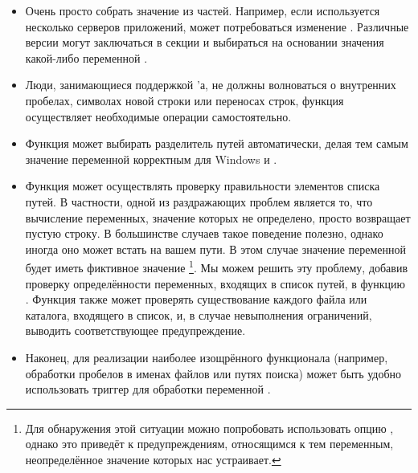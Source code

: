 \begin{itemize}
\item Очень просто собрать значение  из частей.
Например, если используется несколько серверов приложений, может
потребоваться изменение . Различные версии
 могут заключаться в секции  и
выбираться на основании значения какой-либо переменной \GNUmake{}.
\item Люди, занимающиеся поддержкой \Makefile{}'а, не должны
волноваться о внутренних пробелах, символах новой строки или переносах
строк, функция  осуществляет
необходимые операции самостоятельно.
\item Функция  может выбирать
разделитель путей автоматически, делая тем самым значение переменной
корректным для Windows и \UNIX{}.
\item Функция  может осуществлять
проверку правильности элементов списка путей. В частности, одной из
раздражающих проблем \GNUmake{} является то, что вычисление
переменных, значение которых не определено, просто возвращает пустую
строку.  В большинстве случаев такое поведение полезно, однако иногда
оно может встать на вашем пути. В этом случае значение переменной
 будет иметь фиктивное значение%
\footnote{
Для обнаружения этой ситуации можно попробовать использовать опцию
, однако это приведёт
к предупреждениям, относящимся к тем переменным, неопределённое
значение которых нас устраивает.}.
Мы можем решить эту проблему, добавив проверку определённости
переменных, входящих в список путей, в функцию
. Функция также может проверять
существование каждого файла или каталога, входящего в список, и, в
случае невыполнения ограничений, выводить соответствующее
предупреждение.
\item Наконец, для реализации наиболее изощрённого функционала
(например, обработки пробелов в именах файлов или путях поиска) может
быть удобно использовать триггер для обработки переменной
.
\end{itemize}


